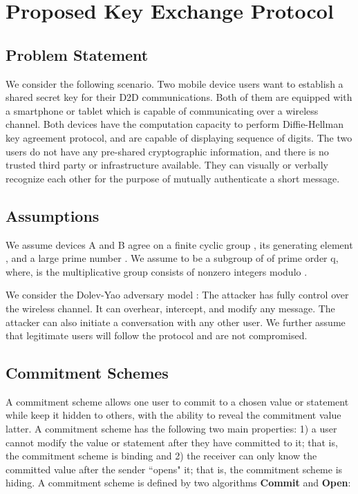 \documentclass[conference]{IEEEtran}
\begin{document}
\section{Proposed Key Exchange Protocol \label{sec3}}




\subsection{Problem Statement}

We consider the following scenario. Two mobile device users want to establish a shared secret key for their D2D communications. Both of them are equipped with a smartphone or tablet which is capable of communicating over a wireless channel. Both devices have the computation capacity to perform Diffie-Hellman key agreement protocol, and are capable of displaying sequence of digits. The two users do not have any pre-shared cryptographic information, and there is no trusted third party or infrastructure available. They can visually or verbally recognize each other for the purpose of mutually authenticate a short message.


\subsection{Assumptions}

We assume devices A and B agree on a finite cyclic group , its generating element , and a large prime number . We assume  to be a subgroup of  of prime order q, where,  is the multiplicative group consists of nonzero integers modulo .

We consider the Dolev-Yao adversary model \cite{mao}: The attacker has fully control over the wireless channel. It can overhear, intercept, and modify any message. The attacker can also initiate a conversation with any other user. We further assume that legitimate users will follow the protocol and are not compromised.

\subsection{Commitment Schemes}
A commitment scheme allows one user to commit to a chosen value or statement while keep it hidden to others, with the ability to reveal the commitment value latter. A commitment scheme has the following two main properties: 1) a user cannot modify the value or statement after they have committed to it; that is, the commitment scheme is binding and 2) the receiver can only know the committed value after the sender ``opens" it; that is, the commitment scheme is hiding. A commitment scheme is defined by two algorithms \textbf{Commit} and \textbf{Open}:
\end{document}
